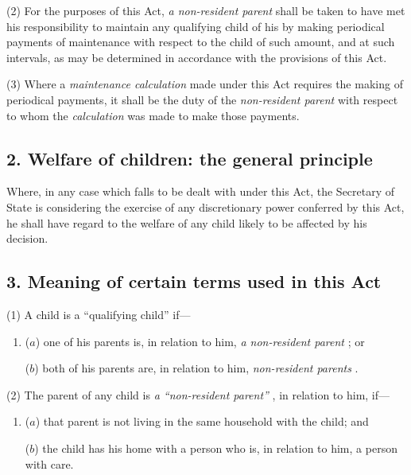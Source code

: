 \documentclass[12pt,a4paper]{article}
\begin{document}
(2) For the purposes of this Act, 
\emph{a non-resident parent}  %
shall be taken to have met his responsibility to maintain any qualifying child of his by making periodical payments of maintenance with respect to the child of such amount, and at such intervals, as may be determined in accordance with the provisions of this Act.

(3) Where a 
\emph{maintenance calculation}  %
made under this Act requires the making of periodical payments, it shall be the duty of the 
\emph{non-resident parent}  %
with respect to whom the 
\emph{calculation}  %
was made to make those payments.

\subsection{2. Welfare of children: the general principle}

Where, in any case which falls to be dealt with under this Act, the Secretary of State 
is considering the exercise of any discretionary power conferred by this Act, he shall have regard to the welfare of any child likely to be affected by his decision.


\subsection{3. Meaning of certain terms used in this Act}

(1) A child is a “qualifying child” if—
\begin{enumerate}\item[]
($a$) one of his parents is, in relation to him, 
\emph{a non-resident parent}%
; or

($b$) both of his parents are, in relation to him, 
\emph{non-resident parents}%
.
\end{enumerate}

(2) The parent of any child is 
\emph{a ``non-resident parent''}%
, in relation to him, if—
\begin{enumerate}\item[]
($a$) that parent is not living in the same household with the child; and

($b$) the child has his home with a person who is, in relation to him, a person with care.
\end{enumerate}
\end{document}
